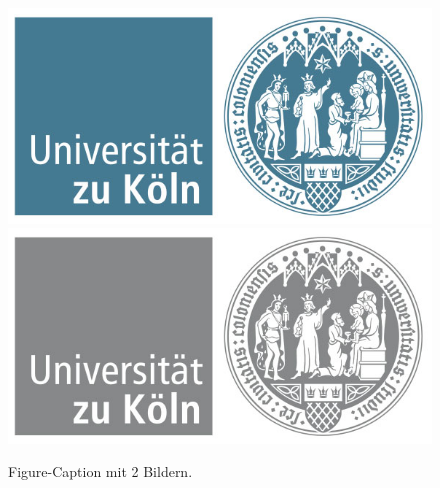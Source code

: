 \begin{figure}
\includegraphics[scale=0.25]{uzk_logo}
\includegraphics[scale=0.25]{uzk_logo_grau}
\caption{Figure-Caption mit 2 Bildern.}
\end{figure}

